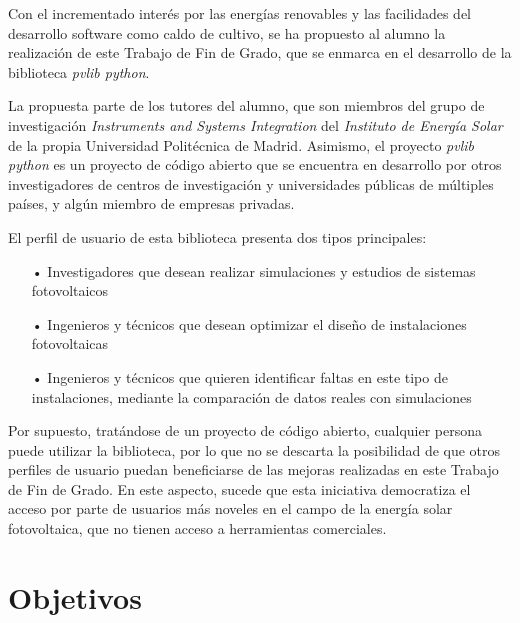 Con el incrementado interés por las energías renovables y las facilidades del desarrollo software como caldo de cultivo, se ha propuesto al alumno la realización de este Trabajo de Fin de Grado, que se enmarca en el desarrollo de la biblioteca \textit{pvlib python}.

La propuesta parte de los tutores del alumno, que son miembros del grupo de investigación \textit{Instruments and Systems Integration} del \textit{Instituto de Energía Solar} de la propia Universidad Politécnica de Madrid. Asimismo, el proyecto \textit{pvlib python} es un proyecto de código abierto que se encuentra en desarrollo por otros investigadores de centros de investigación y universidades públicas de múltiples países, y algún miembro de empresas privadas.

El perfil de usuario de esta biblioteca presenta dos tipos principales:

\begin{itemize}

    \item[•] Investigadores que desean realizar simulaciones y estudios de sistemas fotovoltaicos

    \item[•] Ingenieros y técnicos que desean optimizar el diseño de instalaciones fotovoltaicas

    \item[•] Ingenieros y técnicos que quieren identificar faltas en este tipo de instalaciones, mediante la comparación de datos reales con simulaciones
    
\end{itemize}

Por supuesto, tratándose de un proyecto de código abierto, cualquier persona puede utilizar la biblioteca, por lo que no se descarta la posibilidad de que otros perfiles de usuario puedan beneficiarse de las mejoras realizadas en este Trabajo de Fin de Grado. En este aspecto, sucede que esta iniciativa democratiza el acceso por parte de usuarios más noveles en el campo de la energía solar fotovoltaica, que no tienen acceso a herramientas comerciales.


\section{Objetivos} \label{sct:intro:objetivos}

